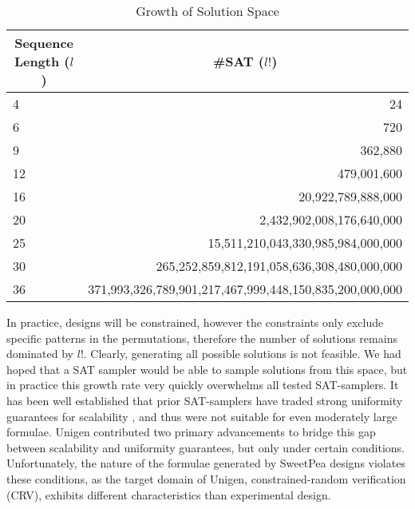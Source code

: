 \begin{table}[t]
  \centering
  \caption{Growth of Solution Space}
\begin{tabular}{|l|r|}
\hline
\multicolumn{1}{|c|}{\textbf{Sequence Length ($l$)}} & \multicolumn{1}{c|}{\textbf{\#SAT ($l!$)}}              \\ \hline
4                                                    & 24                                                      \\ \hline
6                                                    & 720                                                     \\ \hline
9                                                    & 362,880                                                 \\ \hline
12                                                   & 479,001,600                                             \\ \hline
16                                                   & 20,922,789,888,000                                      \\ \hline
20                                                   & 2,432,902,008,176,640,000                               \\ \hline
25                                                   & 15,511,210,043,330,985,984,000,000                      \\ \hline
30                                                   & 265,252,859,812,191,058,636,308,480,000,000             \\ \hline
36                                                   & 371,993,326,789,901,217,467,999,448,150,835,200,000,000 \\ \hline
\end{tabular}
\label{tab:factorial_explosion}
\end{table}

In practice, designs will be constrained, however the constraints only exclude specific patterns in the permutations, therefore the number of solutions remains dominated by $l!$. Clearly, generating all possible solutions is not feasible. We had hoped that a SAT sampler would be able to sample solutions from this space, but in practice this growth rate very quickly overwhelms all tested SAT-samplers. It has been well established that prior SAT-samplers have traded strong uniformity guarantees for scalability \cite{chakraborty_balancing_2014}, and thus were not suitable for even moderately large formulae. Unigen \cite{chakraborty_balancing_2014} contributed two primary advancements to bridge this gap between scalability and uniformity guarantees, but only under certain conditions. Unfortunately, the nature of the formulae generated by SweetPea designs violates these conditions, as the target domain of Unigen, constrained-random verification (CRV), exhibits different characteristics than experimental design.
